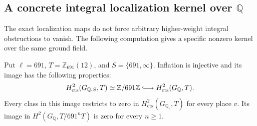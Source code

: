 \subsection{A concrete integral localization kernel over \texorpdfstring{\(\mathbb Q\)}{Q}}
\label{sec:ghost-h2-kernel}

The exact localization maps do not force arbitrary higher-weight
integral obstructions to vanish. The following computation gives
a specific nonzero kernel over the same ground field.

\begin{proposition}
\label{prop:ghost-h2-691}
Put \(\ell=691\), \(T=\mathbb Z_{691}(12)\), and
\(S=\{691,\infty\}\). Inflation is injective and its image
has the following properties:
\[
 H^2_{\mathrm{cts}}(G_{\mathbb Q,S},T)
       \simeq\mathbb Z/691\mathbb Z
       \lhook\joinrel\longrightarrow H^2_{\mathrm{cts}}(G_{\mathbb Q},T).
\]
Every class in this image restricts to zero in
\(H^2_{\mathrm{cts}}(G_{\mathbb Q_v},T)\) for every place
\(v\). Its image in \(H^2(G_{\mathbb Q},T/691^nT)\) is zero
for every \(n\geq1\).
\end{proposition}
